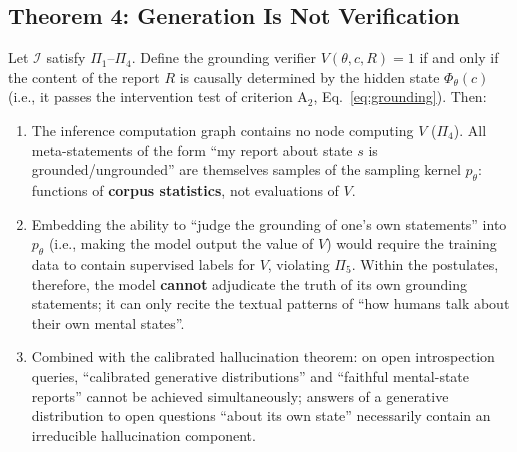 \subsection{Theorem 4: Generation Is Not Verification}

\begin{theorem}\label{thm:gen-verify}
Let $\mathcal{I}$ satisfy $\Pi_1$--$\Pi_4$. Define the grounding verifier
$V(\theta, c, R) = 1$ if and only if the content of the report $R$ is causally determined by
the hidden state $\Phi_\theta(c)$ (i.e., it passes the intervention test of criterion
$\mathrm{A}_2$, Eq.~\eqref{eq:grounding}). Then:

\begin{enumerate}[align=left, labelwidth=!, labelsep=0.8em, leftmargin=!, itemindent=0pt]
\item[(\textbf{4a})\textbf{No verifier node}] The inference computation graph contains no node
computing $V$ ($\Pi_4$). All meta-statements of the form ``my report about state $s$ is
grounded/ungrounded'' are themselves samples of the sampling kernel $p_\theta$: functions of
\textbf{corpus statistics}, not evaluations of $V$.
\item[(\textbf{4b})\textbf{Truth undecidable}] Embedding the ability to ``judge the grounding
of one's own statements'' into $p_\theta$ (i.e., making the model output the value of $V$)
would require the training data to contain supervised labels for $V$, violating $\Pi_5$.
Within the postulates, therefore, the model \textbf{cannot} adjudicate the truth of its own
grounding statements; it can only recite the textual patterns of ``how humans talk about their
own mental states''.
\item[(\textbf{4c})\textbf{Calibration--fidelity tension}] Combined with the calibrated
hallucination theorem\cite{kalai-vempala-2023-calib}: on open introspection queries,
``calibrated generative distributions'' and ``faithful mental-state reports'' cannot be achieved
simultaneously; answers of a generative distribution to open questions ``about its own state''
necessarily contain an irreducible hallucination component.
\end{enumerate}
\end{theorem}

